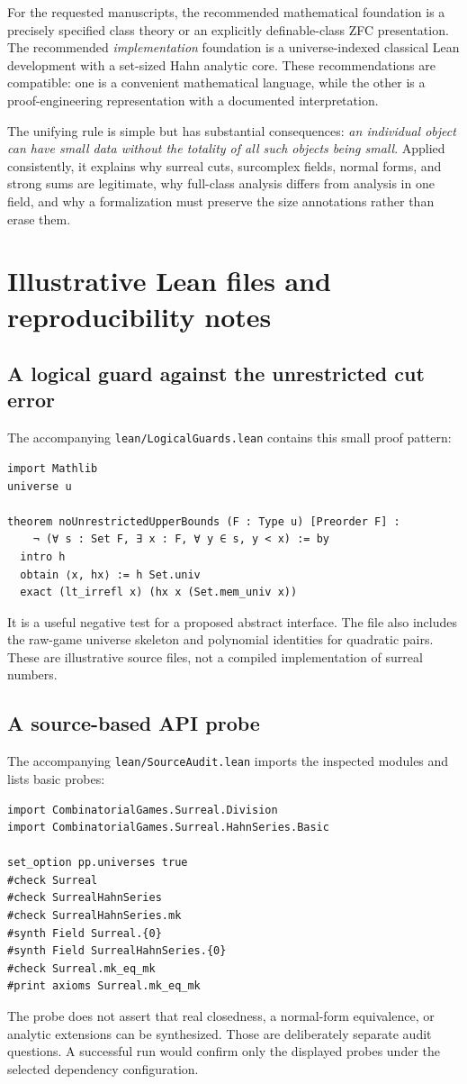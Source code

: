 \documentclass[11pt,letterpaper]{article}
\numberwithin{equation}{section}
\theoremstyle{definition}
\theoremstyle{remark}
\begin{document}
For the requested manuscripts, the recommended mathematical foundation is a precisely specified class theory or an explicitly definable-class ZFC presentation. The recommended \emph{implementation} foundation is a universe-indexed classical Lean development with a set-sized Hahn analytic core. These recommendations are compatible: one is a convenient mathematical language, while the other is a proof-engineering representation with a documented interpretation.

The unifying rule is simple but has substantial consequences: \emph{an individual object can have small data without the totality of all such objects being small}. Applied consistently, it explains why surreal cuts, surcomplex fields, normal forms, and strong sums are legitimate, why full-class analysis differs from analysis in one field, and why a formalization must preserve the size annotations rather than erase them.

\appendix
\section{Illustrative Lean files and reproducibility notes}\label{app:lean}
\subsection{A logical guard against the unrestricted cut error}
The accompanying \texttt{lean/LogicalGuards.lean} contains this small proof pattern:
\begin{lstlisting}
import Mathlib
universe u

theorem noUnrestrictedUpperBounds (F : Type u) [Preorder F] :
    ¬ (∀ s : Set F, ∃ x : F, ∀ y ∈ s, y < x) := by
  intro h
  obtain ⟨x, hx⟩ := h Set.univ
  exact (lt_irrefl x) (hx x (Set.mem_univ x))
\end{lstlisting}
It is a useful negative test for a proposed abstract interface. The file also includes the raw-game universe skeleton and polynomial identities for quadratic pairs. These are illustrative source files, not a compiled implementation of surreal numbers.

\subsection{A source-based API probe}
The accompanying \texttt{lean/SourceAudit.lean} imports the inspected modules and lists basic probes:
\begin{lstlisting}
import CombinatorialGames.Surreal.Division
import CombinatorialGames.Surreal.HahnSeries.Basic

set_option pp.universes true
#check Surreal
#check SurrealHahnSeries
#check SurrealHahnSeries.mk
#synth Field Surreal.{0}
#synth Field SurrealHahnSeries.{0}
#check Surreal.mk_eq_mk
#print axioms Surreal.mk_eq_mk
\end{lstlisting}
The probe does not assert that real closedness, a normal-form equivalence, or analytic extensions can be synthesized. Those are deliberately separate audit questions. A successful run would confirm only the displayed probes under the selected dependency configuration.
\end{document}
